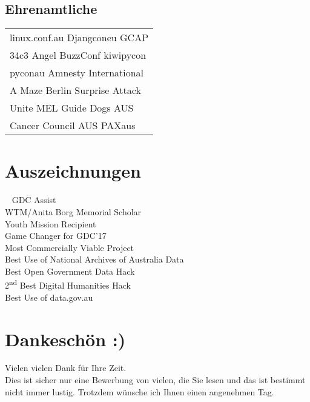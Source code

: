 \documentclass[a4paper]{deedy-resume_twopage} %
\begin{document}
\begin{minipage}[t]{0.33\textwidth}
  \sectionspace
  \subsection{Ehrenamtliche}
  \begin{tabular}{p{}}
  \textbullet{} linux.conf.au \textbullet{} Djangconeu \textbullet{} GCAP\\
  \textbullet{} 34c3 Angel \textbullet{} BuzzConf \textbullet{} kiwipycon \\
  \textbullet{} pyconau \textbullet{} Amnesty International \\
  \textbullet{} A Maze Berlin \textbullet{} Surprise Attack \\
  \textbullet{} Unite MEL \textbullet{} Guide Dogs AUS \\
  \textbullet{} Cancer Council AUS \textbullet{} PAXaus \\
  \end{tabular}

  \sectionspace %

  \section{Auszeichnungen}

  \
  \textbullet{} GDC Assist \\
  \textbullet{}WTM/Anita Borg Memorial Scholar \\
  \textbullet{}Youth Mission Recipient \\
  \textbullet{}Game Changer for GDC'17 \\
  \textbullet{} Most Commercially Viable Project\\
  \textbullet{} Best Use of National Archives of Australia Data \\
  \textbullet{} Best Open Government Data Hack \\
  \textbullet{} 2\textsuperscript{nd} Best Digital Humanities Hack \\
  \location{2013}
  \textbullet{} Best Use of data.gov.au \\

  \sectionspace %


  \section{Dankeschön :)}
  Vielen vielen Dank für Ihre Zeit. \\
  Dies ist sicher nur eine Bewerbung von vielen, die Sie lesen und das ist bestimmt nicht
   immer lustig. Trotzdem wünsche ich Ihnen einen angenehmen Tag. \\


\end{minipage}
\end{document}
